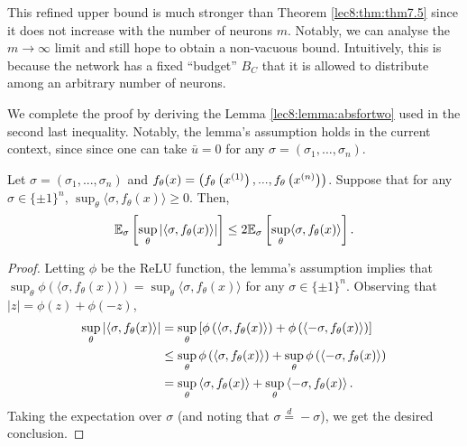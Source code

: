 \begin{remark}
This refined upper bound is much stronger than Theorem \ref{lec8:thm:thm7.5} since it does not increase with the number of neurons $m$. Notably, we can analyse the $m \to \infty$ limit and still hope to obtain a non-vacuous bound. Intuitively, this is because the network has a fixed ``budget'' $B_C$ that it is allowed to distribute among an arbitrary number of neurons.
\end{remark}


We complete the proof by deriving the Lemma \ref{lec8:lemma:absfortwo} used in the second last inequality. Notably, the lemma's assumption holds in the current context, since
since one can take $\bar{u} = 0$ for any $\sigma = (\sigma_1, \dots, \sigma_n)$.

\begin{lemma}\label{lec8:lemma:absfortwo}
Let $\sigma = (\sigma_1, ..., \sigma_n)$ and $f_{\theta}(x) = \left(f_{\theta}\left(x^{(1)}\right), ...,  f_{\theta}\left(x^{(n)} \right)\right)$. Suppose that for any $\sigma \in \{\pm 1\}^n$, $\sup_{\theta} \langle \sigma, f_{\theta}(x) \rangle \geq 0$. Then, 
\begin{equation}
\mathbb{E}_{\sigma}\left[ \sup_{\theta}  \left | \langle \sigma, f_{\theta}(x) \rangle \right|  \right] \leq 2 \mathbb{E}_{\sigma}\left[ \sup_{\theta}  \langle \sigma, f_{\theta}(x) \rangle   \right].
\end{equation}
\end{lemma}

\begin{proof}
Letting $\phi$ be the ReLU function, the lemma's assumption implies that $\sup_{\theta} \phi\left(\langle \sigma, f_{\theta}(x) \rangle\right) = \sup_{\theta}\langle \sigma, f_{\theta}(x) \rangle$ for any $\sigma \in \{\pm 1\}^n$. Observing that $|z| = \phi(z) + \phi(-z)$, 
\begin{align}
\sup_{\theta} \abs{\inprod{ \sigma, f_{\theta}(x) }}%
&= \sup_{\theta} \left[ \phi \l(\inprod{ \sigma, f_{\theta}(x) } \r) + \phi \l(\inprod{-\sigma, f_{\theta}(x) } \r)\right] \\
&\le \sup_{\theta}  \phi \l(\inprod{ \sigma, f_{\theta}(x) } \r) +  \sup_{\theta}  \phi \l(\inprod{-\sigma, f_{\theta}(x) } \r)  \\
&= \sup_{\theta} \inprod{ \sigma, f_{\theta}(x) } +  \sup_{\theta}  \inprod{-\sigma, f_{\theta}(x) }. 
\end{align}
Taking the expectation over $\sigma$ (and noting that $\sigma \overset d = -\sigma$), we get the desired conclusion.
\end{proof}


